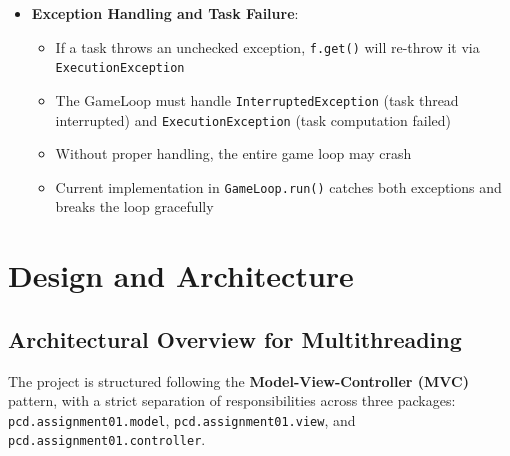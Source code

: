 \documentclass[12pt,a4paper]{article}
\begin{document}
\begin{itemize}
    \item \textbf{Exception Handling and Task Failure}:
    \begin{itemize}
        \item If a task throws an unchecked exception, \texttt{f.get()} will re-throw it via \texttt{ExecutionException}
        \item The GameLoop must handle \texttt{InterruptedException} (task thread interrupted) and \texttt{ExecutionException} (task computation failed)
        \item Without proper handling, the entire game loop may crash
        \item Current implementation in \texttt{GameLoop.run()} catches both exceptions and breaks the loop gracefully
    \end{itemize}
\end{itemize}

\section{Design and Architecture}

\subsection{Architectural Overview for Multithreading}

The project is structured following the \textbf{Model-View-Controller (MVC)} pattern,
with a strict separation of responsibilities across three packages:
\texttt{pcd.assignment01.model}, \texttt{pcd.assignment01.view}, and
\texttt{pcd.assignment01.controller}.
 
\end{document}
